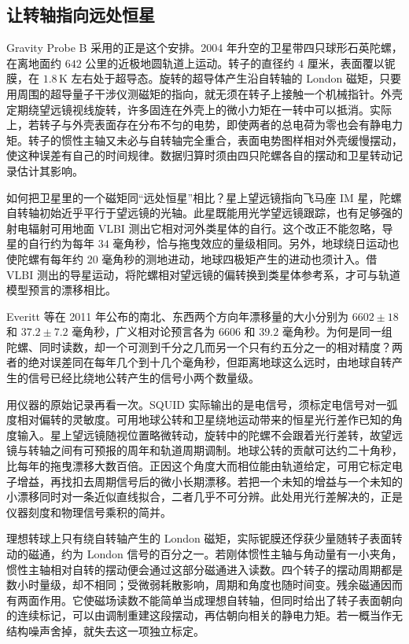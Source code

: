 \subsection{让转轴指向远处恒星}\label{sec:pn-gyro-guide}

Gravity Probe B 采用的正是这个安排。2004 年升空的卫星带四只球形石英陀螺，在离地面约 $642$ 公里的近极地圆轨道上运动。转子的直径约 $4$ 厘米，表面覆以铌膜，在 $1.8\,\mathrm K$ 左右处于超导态。旋转的超导体产生沿自转轴的 London 磁矩，只要用周围的超导量子干涉仪测磁矩的指向，就无须在转子上接触一个机械指针。外壳定期绕望远镜视线旋转，许多固连在外壳上的微小力矩在一转中可以抵消。实际上，若转子与外壳表面存在分布不匀的电势，即使两者的总电荷为零也会有静电力矩。转子的惯性主轴又未必与自转轴完全重合，表面电势图样相对外壳缓慢摆动，使这种误差有自己的时间规律。数据归算时须由四只陀螺各自的摆动和卫星转动记录估计其影响。

如何把卫星里的一个磁矩同“远处恒星”相比？星上望远镜指向飞马座 IM 星，陀螺自转轴初始近乎平行于望远镜的光轴。此星既能用光学望远镜跟踪，也有足够强的射电辐射可用地面 VLBI 测出它相对河外类星体的自行。这个改正不能忽略，导星的自行约为每年 $34$ 毫角秒，恰与拖曳效应的量级相同。另外，地球绕日运动也使陀螺有每年约 $20$ 毫角秒的测地进动，地球四极矩产生的进动也须计入。借 VLBI 测出的导星运动，将陀螺相对望远镜的偏转换到类星体参考系，才可与轨道模型预言的漂移相比。

Everitt 等在 2011 年公布的南北、东西两个方向年漂移量的大小分别为 $6602\pm18$ 和 $37.2\pm7.2$ 毫角秒，广义相对论预言各为 $6606$ 和 $39.2$ 毫角秒。为何是同一组陀螺、同时读数，却一个可测到千分之几而另一个只有约五分之一的相对精度？两者的绝对误差同在每年几个到十几个毫角秒，但距离地球这么远时，由地球自转产生的信号已经比绕地公转产生的信号小两个数量级。

用仪器的原始记录再看一次。SQUID 实际输出的是电信号，须标定电信号对一弧度相对偏转的灵敏度。可用地球公转和卫星绕地运动带来的恒星光行差作已知的角度输入。星上望远镜随视位置略微转动，旋转中的陀螺不会跟着光行差转，故望远镜与转轴之间有可预报的周年和轨道周期调制。地球公转的贡献可达约二十角秒，比每年的拖曳漂移大数百倍。正因这个角度大而相位能由轨道给定，可用它标定电子增益，再找扣去周期信号后的微小长期漂移。若把一个未知的增益与一个未知的小漂移同时对一条近似直线拟合，二者几乎不可分辨。此处用光行差解决的，正是仪器刻度和物理信号乘积的简并。

理想转球上只有绕自转轴产生的 London 磁矩，实际铌膜还俘获少量随转子表面转动的磁通，约为 London 信号的百分之一。若刚体惯性主轴与角动量有一小夹角，惯性主轴相对自转的摆动便会通过这部分磁通进入读数。四个转子的摆动周期都是数小时量级，却不相同；受微弱耗散影响，周期和角度也随时间变。残余磁通因而有两面作用。它使磁场读数不能简单当成理想自转轴，但同时给出了转子表面朝向的连续标记，可以由调制重建这段摆动，再估朝向相关的静电力矩。若一概当作无结构噪声舍掉，就失去这一项独立标定。

